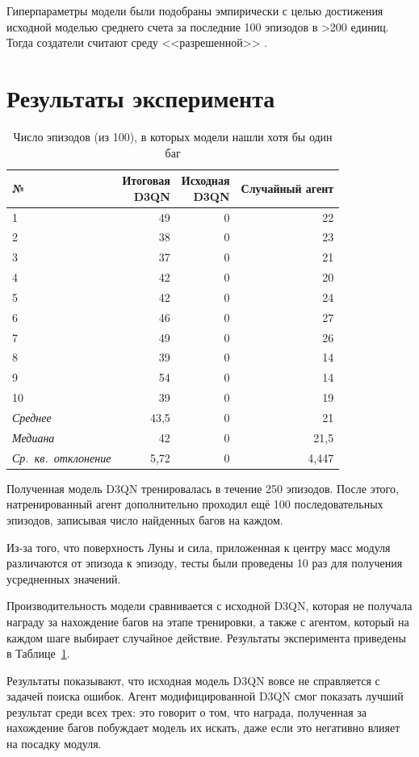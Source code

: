 Гиперпараметры модели были подобраны эмпирически с целью достижения исходной моделью среднего счета за последние 100 эпизодов в >200 единиц. Тогда создатели считают среду <<разрешенной>> \cite{lunarlanderv2}.

\section{Результаты эксперимента}

\begin{table}[ht]
	\centering
	\caption{Число эпизодов (из 100), в которых модели нашли хотя бы один баг}
	\begin{tabular}{ l r r r }
		\hline
		№ & \makecell[r]{Итоговая\\D3QN} & \makecell[r]{Исходная\\D3QN} & Случайный агент \\
		\hline
		1 & 49 & 0 & 22\\
		2 & 38 & 0 & 23\\
		3 & 37 & 0 & 21\\
		4 & 42 & 0 & 20\\
		5 & 42 & 0 & 24\\
		6 & 46 & 0 & 27\\
		7 & 49 & 0 & 26\\
		8 & 39 & 0 & 14\\
		9 & 54 & 0 & 14\\
		10 & 39 & 0 & 19\\
		\hline
		\textit{Среднее} & 43,5 & 0 & 21 \\
		\textit{Медиана} & 42 & 0 & 21,5 \\
		\textit{Ср.~кв.~отклонение} & 5,72 & 0 & 4,447 \\
		\hline
	\end{tabular}
	\label{tab:results}
\end{table}

Полученная модель D3QN тренировалась в течение 250 эпизодов. После этого, натренированный агент дополнительно проходил ещё 100 последовательных эпизодов, записывая число найденных багов на каждом. 

Из-за того, что поверхность Луны и сила, приложенная к центру масс модуля различаются от эпизода к эпизоду, тесты были проведены 10 раз для получения усредненных значений.

Производительность модели сравнивается с исходной D3QN, которая не получала награду за нахождение багов на этапе тренировки, а также с агентом, который на каждом шаге выбирает случайное действие. Результаты эксперимента приведены в Таблице~\ref{tab:results}. 

Результаты показывают, что исходная модель D3QN вовсе не справляется с задачей поиска ошибок. Агент модифицированной D3QN смог показать лучший результат среди всех трех: это говорит о том, что награда, полученная за нахождение багов побуждает модель их искать, даже если это негативно влияет на посадку модуля.

\endgroup

